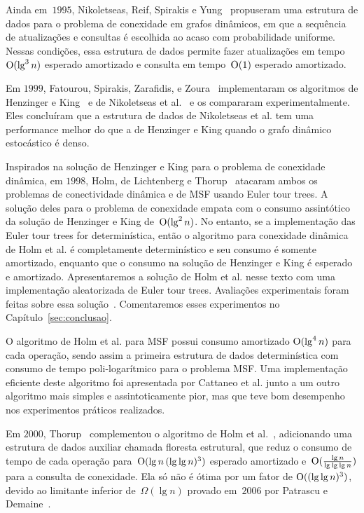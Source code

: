 Ainda em~$1995$, Nikoletseas, Reif, Spirakis e Yung~\cite{NikoletseasRSY} propuseram uma estrutura de dados para o problema  de conexidade em grafos dinâmicos, em que a sequência de atualizações e consultas é escolhida ao acaso com probabilidade uniforme.
Nessas condições, essa estrutura de dados permite fazer atualizações em tempo~$\mathrm{O}(\lg^3 n)$ esperado amortizado e consulta em tempo~$\mathrm{O}(1)$ esperado amortizado.

Em $1999$, Fatourou, Spirakis, Zarafidis, e Zoura~\cite{Fatourou} implementaram os algoritmos de Henzinger e King~\cite{HenzingerKing} e de Nikoletseas et al.~\cite{NikoletseasRSY} e os compararam experimentalmente.
Eles concluíram que a estrutura de dados de Nikoletseas et al. tem uma performance melhor do que a de Henzinger e King quando o grafo dinâmico estocástico é denso.

Inspirados na solução de Henzinger e King para o problema de conexidade dinâmica, em $1998$, Holm, de Lichtenberg e Thorup~\cite{poly_log} atacaram ambos os problemas de conectividade dinâmica e de MSF usando Euler tour trees.
A solução deles para o problema de conexidade empata com o consumo assintótico da solução de Henzinger e King de~$\mathrm{O}(\lg^2 n)$.
No entanto, se a implementação das Euler tour trees for determinística, então o algoritmo para conexidade dinâmica de Holm et al. é completamente determinístico e seu consumo é somente amortizado,
enquanto que o consumo na solução de Henzinger e King é esperado e amortizado. 
Apresentaremos a solução de Holm et al. nesse texto com uma implementação aleatorizada de Euler tour trees.
Avaliações experimentais foram feitas sobre essa solução~\cite{EmpiricalStudy1997, EmpiricalStudy2002,xp-Phylogeny}.
Comentaremos esses experimentos no Capítulo~\ref{sec:conclusao}.

O algoritmo de Holm et al. para MSF possui consumo amortizado $\mathrm{O}(\lg^4 n)$ para cada operação, sendo assim a primeira estrutura de dados determinística com consumo de tempo poli-logarítmico para o problema MSF. Uma implementação eficiente deste algoritmo foi apresentada por Cattaneo et al. \cite{xpstudy2002} junto a um outro algoritmo mais simples e assintoticamente pior, mas que teve bom desempenho nos experimentos práticos realizados.

Em $2000$, Thorup~\cite{Thorup2000} complementou o algoritmo de Holm et al.~\cite{poly_log}, adicionando uma estrutura de dados auxiliar chamada floresta estrutural, que reduz o consumo de tempo de cada operação para~$\mathrm{O}(\lg n\, (\lg\lg n)^3)$ esperado amortizado e~$\mathrm{O}(\frac{\lg n}{\lg \lg \lg n})$ para a consulta de conexidade.
Ela só não é ótima por um fator de $\mathrm{O}((\lg\lg n)^3)$, devido ao limitante inferior de~$\Omega(\lg n)$ provado em~$2006$ por Patrascu e Demaine~\cite{lowerBoundPatrascu}.

